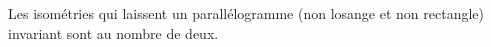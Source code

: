 Les isométries qui laissent un parallélogramme (non losange et non rectangle) invariant sont au nombre de deux.

\begin{reponses}
\end{reponses}

